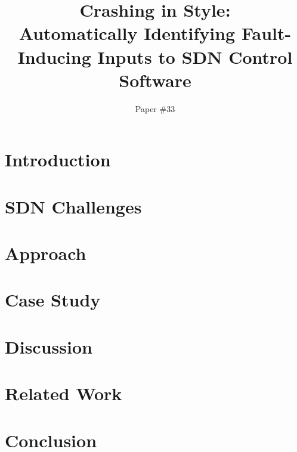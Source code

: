 \documentclass{sig-alt-hotnets}
\title{Crashing in Style: \\ Automatically Identifying Fault-Inducing Inputs to SDN Control Software}
\author{Paper \#33}
\begin{document}
    \date{}
    \maketitle

    \thispagestyle{empty}

\abstract{{\it }}

\section{Introduction}
\label{sec:intro}


\section{SDN Challenges}
\label{sec:overview}


\section{Approach}
\label{sec:approach}


\section{Case Study}
\label{sec:casestudy}


\section{Discussion}
\label{sec:discussion}


\section{Related Work}
\label{sec:related_work}


\section{Conclusion}
\label{sec:conclusion}


 \small 

%
\end{document}
